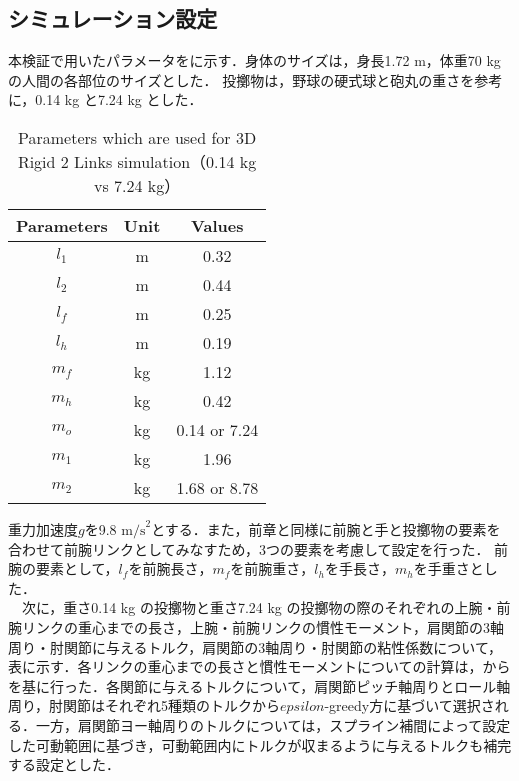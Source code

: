 \subsection{シミュレーション設定}
本検証で用いたパラメータをに示す．身体のサイズは，身長1.72 m，体重70 kgの人間の各部位のサイズとした．
投擲物は，野球の硬式球と砲丸の重さを参考に，0.14 kg と7.24 kg とした．
\begin{table}[tb]
  \begin{center}
    \caption{Parameters which are used for 3D Rigid 2 Links simulation（0.14 kg vs 7.24 kg）}
    \begin{tabular}{c|c|c}
      \hline
      Parameters & Unit & Values \\
      \hline
      $l_{1}$ & m & 0.32 \\
      $l_{2}$ & m & 0.44 \\
      $l_{f}$ & m & 0.25 \\
      $l_{h}$ & m & 0.19 \\
      $m_{f}$ & kg & 1.12 \\
      $m_{h}$ & kg & 0.42 \\
      $m_{o}$ & kg & 0.14 or 7.24 \\
      $m_{1}$ & kg & 1.96 \\
      $m_{2}$ & kg & 1.68 or 8.78 \\
      \hline
    \end{tabular}
  \end{center}
\end{table}
重力加速度$g$を9.8 $\mathrm{m/s}^{2}$とする．また，前章と同様に前腕と手と投擲物の要素を合わせて前腕リンクとしてみなすため，3つの要素を考慮して設定を行った．
前腕の要素として，$l_{f}$を前腕長さ，$m_{f}$を前腕重さ，$l_{h}$を手長さ，$m_{h}$を手重さとした．\\
　次に，重さ0.14 kg の投擲物と重さ7.24 kg の投擲物の際のそれぞれの上腕・前腕リンクの重心までの長さ，上腕・前腕リンクの慣性モーメント，肩関節の3軸周り・肘関節に与えるトルク，肩関節の3軸周り・肘関節の粘性係数について，表に示す．各リンクの重心までの長さと慣性モーメントについての計算は，からを基に行った．各関節に与えるトルクについて，肩関節ピッチ軸周りとロール軸周り，肘関節はそれぞれ5種類のトルクから$epsilon$-greedy方に基づいて選択される．一方，肩関節ヨー軸周りのトルクについては，スプライン補間によって設定した可動範囲に基づき，可動範囲内にトルクが収まるように与えるトルクも補完する設定とした．

